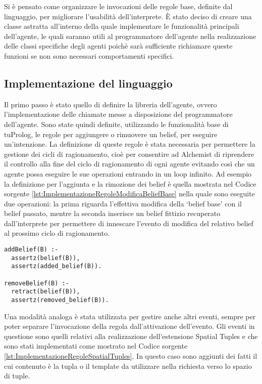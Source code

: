 Si è pensato come organizzare le invocazioni delle regole base, definite dal linguaggio, per migliorare l'usabilità dell'interprete. \`E stato deciso di creare una classe astratta all'interno della quale implementare le funzionalità principali dell'agente, le quali saranno utili al programmatore dell'agente nella realizzazione delle classi specifiche degli agenti poichè sarà sufficiente richiamare queste funzioni se non sono necessari comportamenti specifici.

\subsection{Implementazione del linguaggio}\label{sctn:ImplementazioneLinguaggio}
Il primo passo è stato quello di definire la libreria dell'agente, ovvero l'implementazione delle chiamate messe a disposizione del programmatore dell'agente. Sono state quindi definite, utilizzando le funzionalità base di tuProlog, le regole per aggiungere o rimuovere un belief, per eseguire un'intenzione.
La definizione di queste regole è stata necessaria per permettere la gestione dei cicli di ragionamento, cioè per consentire ad Alchemist di riprendere il controllo alla fine del ciclo di ragionamento di ogni agente evitando così che un agente possa eseguire le sue operazioni entrando in un loop infinito.
Ad esempio la definizione per l'aggiunta e la rimozione dei belief è quella mostrata nel Codice sorgente \ref{lst:ImplementazioneRegoleModificaBeliefBase} nella quale sono eseguite due operazioni: la prima riguarda l'effettiva modifica della `belief base' con il belief passato, mentre la seconda inserisce un belief fittizio recuperato dall'interprete per permettere di innescare l'evento di modifica del relativo belief al prossimo ciclo di ragionamento.

\medskip
\begin{lstlisting}[firstnumber=1,label={lst:ImplementazioneRegoleModificaBeliefBase},caption={Implementazione regole modifica della `belief base'}]
addBelief(B) :-
  assertz(belief(B)),
  assertz(added_belief(B)).

removeBelief(B) :-
  retract(belief(B)),
  assertz(removed_belief(B)).
\end{lstlisting}

Una modalità analoga è stata utilizzata per gestire anche altri eventi, sempre per poter separare l'invocazione della regola dall'attivazione dell'evento. Gli eventi in questione sono quelli relativi alla realizzazione dell'estensione Spatial Tuples e che sono stati implementati come mostrato nel Codice sorgente \ref{lst:ImplementazioneRegoleSpatialTuples}. In questo caso sono aggiunti dei fatti il cui contenuto è la tupla o il template da utilizzare nella richiesta verso lo spazio di tuple.


